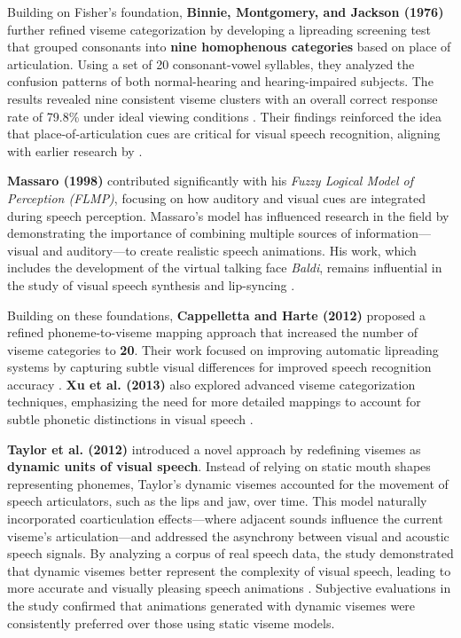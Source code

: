 \documentclass[12pt]{article}
\begin{document}
Building on Fisher’s foundation, \textbf{Binnie, Montgomery, and Jackson (1976)} further refined viseme categorization by developing a lipreading screening test that grouped consonants into \textbf{nine homophenous categories} based on place of articulation. Using a set of 20 consonant-vowel syllables, they analyzed the confusion patterns of both normal-hearing and hearing-impaired subjects. The results revealed nine consistent viseme clusters with an overall correct response rate of 79.8\% under ideal viewing conditions \cite{Binnie1976VisualRehabilitation}. Their findings reinforced the idea that place-of-articulation cues are critical for visual speech recognition, aligning with earlier research by \cite{WOODWARD1960PhonemeLipreading}.

\textbf{Massaro (1998)} contributed significantly with his \textit{Fuzzy Logical Model of Perception (FLMP)}, focusing on how auditory and visual cues are integrated during speech perception. Massaro's model has influenced research in the field by demonstrating the importance of combining multiple sources of information—visual and auditory—to create realistic speech animations. His work, which includes the development of the virtual talking face \textit{Baldi}, remains influential in the study of visual speech synthesis and lip-syncing \cite{Massaro1998PerceivingPrinciple}.

Building on these foundations, \textbf{Cappelletta and Harte (2012)} proposed a refined phoneme-to-viseme mapping approach that increased the number of viseme categories to \textbf{20}. Their work focused on improving automatic lipreading systems by capturing subtle visual differences for improved speech recognition accuracy \cite{Cappelletta2012Phoneme-to-visemeRecognition}. \textbf{Xu et al. (2013)} also explored advanced viseme categorization techniques, emphasizing the need for more detailed mappings to account for subtle phonetic distinctions in visual speech \cite{Xu2013AGames}.

\textbf{Taylor et al. (2012)} introduced a novel approach by redefining visemes as \textbf{dynamic units of visual speech}. Instead of relying on static mouth shapes representing phonemes, Taylor’s dynamic visemes accounted for the movement of speech articulators, such as the lips and jaw, over time. This model naturally incorporated coarticulation effects—where adjacent sounds influence the current viseme’s articulation—and addressed the asynchrony between visual and acoustic speech signals. By analyzing a corpus of real speech data, the study demonstrated that dynamic visemes better represent the complexity of visual speech, leading to more accurate and visually pleasing speech animations \cite{Taylor2012DynamicSpeech}. Subjective evaluations in the study confirmed that animations generated with dynamic visemes were consistently preferred over those using static viseme models.
\end{document}
